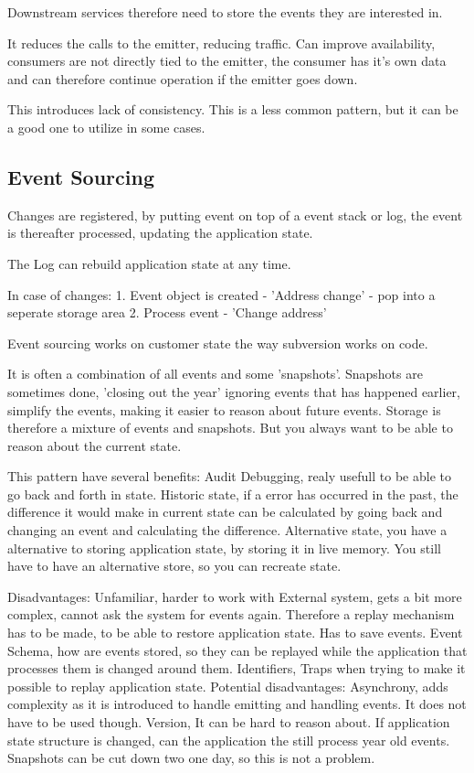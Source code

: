 {Downstream services therefore need to store the events they are interested in. 

It reduces the calls to the emitter, reducing traffic. Can improve availability, consumers are not directly tied to the emitter, the consumer has it's own data and can therefore continue operation if the emitter goes down.

This introduces lack of consistency. This is a less common pattern, but it can be a good one to utilize in some cases.

\subsection{Event Sourcing}
Changes are registered, by putting event on top of a event stack or log, the event is thereafter processed, updating the application state.

The Log can rebuild application state at any time.

In case of changes:
1. Event object is created - 'Address change' - pop into a seperate storage area
2. Process event - 'Change address'

Event sourcing works on customer state the way subversion works on code.

It is often a combination of all events and some 'snapshots'. Snapshots are sometimes done, 'closing out the year' ignoring events that has happened earlier, simplify the events, making it easier to reason about future events. Storage is therefore a mixture of events and snapshots. But you always want to be able to reason about the current state.

This pattern have several benefits:
Audit
Debugging, realy usefull to be able to go back and forth in state.
Historic state, if a error has occurred in the past, the difference it would make in current state can be calculated by going back and changing an event and calculating the difference.
Alternative state, you have a alternative to storing application state, by storing it in live memory. You still have to have an alternative store, so you can recreate state.

Disadvantages:
Unfamiliar, harder to work with
External system, gets a bit more complex, cannot ask the system for events again. Therefore a replay mechanism has to be made, to be able to restore application state. Has to save events.
Event Schema, how are events stored, so they can be replayed while the application that processes them is changed around them.
Identifiers, Traps when trying to make it possible to replay application state.
Potential disadvantages:
Asynchrony, adds complexity as it is introduced to handle emitting and handling events. It does not have to be used though.
Version, It can be hard to reason about. If application state structure is changed, can the application the still process year old events. Snapshots can be cut down two one day, so this is not a problem.

}
